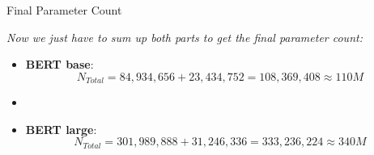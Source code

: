 \documentclass[11pt,compress,t,notes=noshow, xcolor=table]{beamer}
\begin{document}

\begin{frame}{Final Parameter Count}

\bigskip

\textit{Now we just have to sum up both parts to get the final parameter count:}

\bigskip

\begin{itemize}
	\item \textbf{BERT base}: 
	$$N_{Total} = 84,934,656 + 23,434,752 = 108,369,408 \approx 110M$$
	\item[]
	\item \textbf{BERT large}:
	$$N_{Total} = 301,989,888 + 31,246,336 = 333,236,224 \approx 340M$$
\end{itemize}
	
\end{frame}


\endlecture
\end{document}
